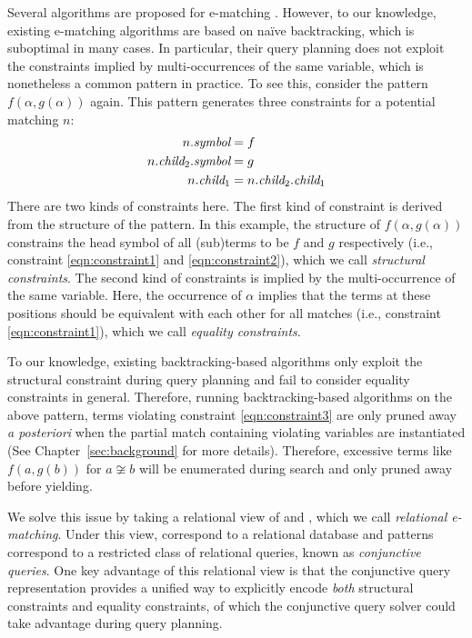 Several algorithms are proposed for e-matching \citep{efficient-ematching,simplify}.
However, to our knowledge, existing e-matching algorithms are based on na\"ive backtracking, which is suboptimal in many cases. 
In particular, their query planning does not exploit the constraints implied by multi-occurrences of the same variable, which is nonetheless a common pattern in practice.
To see this, consider the pattern $f(\alpha,g(\alpha))$ again. 
This pattern generates three constraints for a potential matching \enode $n$: 
\begin{align}
    n.\textit{symbol}&=f \label{eqn:constraint1}\\
    n.\textit{child}_2.\textit{symbol}&=g \label{eqn:constraint2}\\
    n.\textit{child}_1&=n.\textit{child}_2.\textit{child}_1 \label{eqn:constraint3}
\end{align}
There are two kinds of constraints here. The first kind of constraint is derived from the structure of the pattern. In this example, the structure of $f(\alpha, g(\alpha))$ constrains the head symbol of all (sub)terms to be $f$ and $g$ respectively (i.e., constraint \ref{eqn:constraint1} and \ref{eqn:constraint2}), which we call {\it structural constraints}. The second kind of constraints is implied by the multi-occurrence of the same variable. Here, the occurrence of $\alpha$ implies that the terms at these positions should be equivalent with each other for all matches (i.e., constraint \ref{eqn:constraint1}), which we call {\it equality constraints}. 

To our knowledge, existing backtracking-based algorithms only exploit the structural constraint during query planning and fail to consider equality constraints in general. Therefore, running backtracking-based algorithms on the above pattern, terms violating constraint \ref{eqn:constraint3} are only pruned away \textit{a posteriori} when the partial match containing violating variables are instantiated (See Chapter~\ref{sec:background} for more details). Therefore, excessive terms like $f(a, g(b))$ for $a\not\cong b$ will be enumerated during search and only pruned away before yielding. 

We solve this issue by taking a relational view of \egraphs and \ematching, which we call \textit{relational e-matching}. Under this view, \egraphs correspond to a relational database and \ematching patterns correspond to a restricted class of relational queries, known as {\it conjunctive queries}. One key advantage of this relational view is that the conjunctive query representation provides a unified way to explicitly encode \textit{both} structural constraints and equality constraints, of which the conjunctive query solver could take advantage during query planning. 

